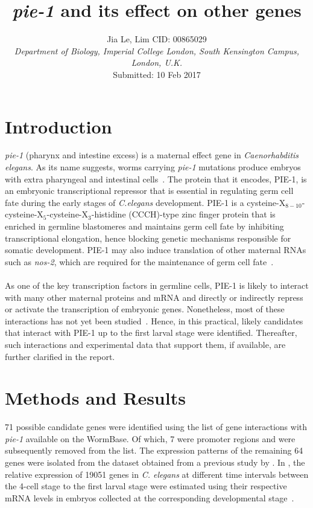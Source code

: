 \documentclass[11pt]{article}
\title{\textbf{\huge{\textit{pie-1} and its effect on other genes}}}
\date{}
\author{%
\large{ Jia Le, Lim {  } CID: 00865029 } \\
\textnormal
{\textit{Department of Biology, Imperial College London, South Kensington Campus, London, U.K.}} \\
Submitted: 10 Feb 2017
}
\makeatletter
\renewcommand{\maketitle}{\bgroup\setlength{\parindent}{0pt}
\begin{flushleft}
  \textbf{\@title} %

  \@author
\end{flushleft}\egroup
}
\makeatother
\begin{document}
\maketitle
\bigskip

\tableofcontents

\newpage

\section{Introduction}
\textit{pie-1} (pharynx and intestine excess) is a maternal effect gene in \textit{Caenorhabditis elegans}. As its name suggests, worms carrying \textit{pie-1} mutations produce embryos with extra pharyngeal and intestinal cells~\citep{Mello1992}. The protein that it encodes, PIE-1, is an embryonic transcriptional repressor that is essential in regulating germ cell fate during the early stages of \textit{C.elegans} development. PIE-1 is a cysteine-X$_{8-10}$-cysteine-X$_{5}$-cysteine-X$_{3}$-histidine (CCCH)-type zinc finger protein that is enriched in germline blastomeres and maintains germ cell fate by inhibiting transcriptional elongation, hence blocking genetic mechanisms responsible for somatic development. PIE-1 may also induce translation of other maternal RNAs such as \textit{nos-2}, which are required for the maintenance of germ cell fate~\citep{Ghosh2008, Gilbert2000, Tenenhaus2001}.
\\
\\
As one of the key transcription factors in germline cells, PIE-1 is likely to interact with many other maternal proteins and mRNA and directly or indirectly repress or activate the transcription of embryonic genes. Nonetheless, most of these interactions has not yet been studied~\citep{Gilbert2000}. Hence, in this practical, likely candidates that interact with PIE-1 up to the first larval stage were identified. Thereafter, such interactions and experimental data that support them, if available, are further clarified in the report.

\section{Methods and Results}

71 possible candidate genes were identified using the list of gene interactions with \textit{pie-1} available on the WormBase. Of which, 7 were promoter regions and were subsequently removed from the list. The expression patterns of the remaining 64 genes were isolated from the dataset obtained from a previous study by \citet{Levin2012}. In \citet{Levin2012}, the relative expression of 19051 genes in \textit{C. elegans} at different time intervals between the 4-cell stage to the first larval stage were estimated using their respective mRNA levels in embryos collected at the corresponding developmental stage~\citep{Levin2012}. 
\end{document}
